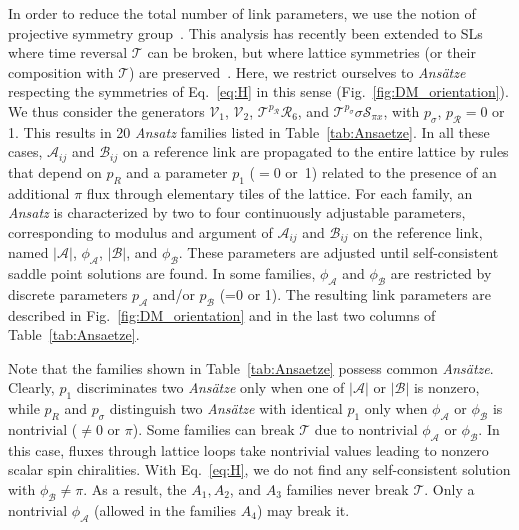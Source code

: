 \documentclass[aps,prl,twocolumn,superscriptaddress,showpacs,a4paper, longbibliography]{revtex4-1}
\begin{document}
In order to reduce the total number of link parameters, we use the notion of projective symmetry group~\cite{Wen_PSG, PSG}.
This analysis has recently been extended to SLs where time reversal $\mathcal T$ can be broken, but where lattice symmetries (or their composition with $\mathcal T$) are preserved~\cite{PSG_chiral, kagome_SFMFT_chiral, PSG_chiral_fermions}.
Here, we restrict ourselves to \textit{Ans\"atze} respecting the symmetries of Eq.~\eqref{eq:H} in this sense (Fig.~\ref{fig:DM_orientation}).
We thus consider the generators
$\mathcal V_1$,
$\mathcal V_2$,
$\mathcal T^{p_\mathcal R}\mathcal R_6$, and
$\mathcal T^{p_\sigma} \sigma \mathcal S_{\pi x}$,
with $p_\sigma$, $p_\mathcal R=0$ or 1.
This results in 20 \textit{Ansatz} families listed in Table~\ref{tab:Ansaetze}.
In all these cases, $\mathcal A_{ij}$ and $\mathcal B_{ij}$ on a reference link are propagated to the entire lattice by rules that depend on $p_R$ and a parameter $p_1$ ($=0$ or~1) related to the presence of an additional $\pi$ flux through elementary tiles of the lattice.
For each family, an \textit{Ansatz} is characterized by two to four continuously adjustable parameters, corresponding to modulus and argument of $\mathcal A_{ij}$ and $\mathcal B_{ij}$ on the reference link, named $|\mathcal A|$, $\phi_{\mathcal A}$, $|\mathcal B|$, and $\phi_{\mathcal B}$.
These parameters are adjusted until self-consistent saddle point solutions are found.
In some families, $\phi_{\mathcal A}$ and $\phi_{\mathcal B}$ are restricted by discrete parameters $p_{\mathcal A}$ and/or $p_{\mathcal B}$ (=0 or 1).
The resulting link parameters are described in Fig.~\ref{fig:DM_orientation} and in the last two columns of Table~\ref{tab:Ansaetze}.

Note that the families shown in Table~\ref{tab:Ansaetze} possess common \textit{Ans\"atze}.
Clearly, $p_1$ discriminates two \textit{Ans\"atze} only when one of $|\mathcal A|$ or $|\mathcal B|$ is nonzero, while $p_R$ and $p_\sigma$ distinguish two \textit{Ans\"atze} with identical $p_1$ only when $\phi_\mathcal A$ or $\phi_\mathcal B$ is nontrivial ($\neq 0$ or $\pi$).
Some families can break $\mathcal T$ due to nontrivial $\phi_{\mathcal A}$ or $\phi_{\mathcal B}$.
In this case, fluxes through lattice loops take nontrivial values leading to nonzero scalar spin chiralities.
With Eq.~\eqref{eq:H}, we do not find any self-consistent solution with $\phi_{\mathcal B}\neq \pi$.
As a result, the $A_1, A_2$, and $A_3$ families never break $\mathcal T$.
Only a nontrivial $\phi_{\mathcal A}$ (allowed in the families $A_4$) may break it.
\end{document}
